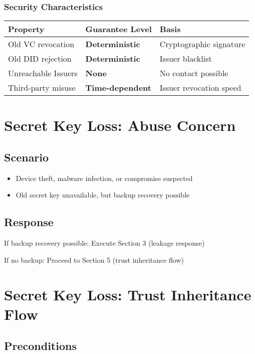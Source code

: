 \subsubsection{Security Characteristics}

\begin{table}[h]
\centering
\begin{tabular}{|l|l|l|}
\hline
\textbf{Property} & \textbf{Guarantee Level} & \textbf{Basis} \\
\hline
Old VC revocation & \textbf{Deterministic} & Cryptographic signature \\
Old DID rejection & \textbf{Deterministic} & Issuer blacklist \\
Unreachable Issuers & \textbf{None} & No contact possible \\
Third-party misuse & \textbf{Time-dependent} & Issuer revocation speed \\
\hline
\end{tabular}
\end{table}

\section{Secret Key Loss: Abuse Concern}

\subsection{Scenario}

\begin{itemize}
  \item Device theft, malware infection, or compromise suspected
  \item Old secret key unavailable, but backup recovery possible
\end{itemize}

\subsection{Response}

If backup recovery possible: Execute Section 3 (leakage response)

If no backup: Proceed to Section 5 (trust inheritance flow)

\section{Secret Key Loss: Trust Inheritance Flow}

\subsection{Preconditions}

